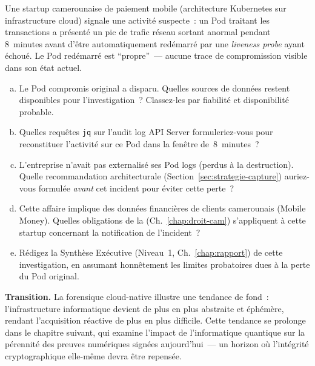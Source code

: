 \begin{boxexo}[title={\ding{45}\quad Exercice~23.3 --- Incident Kubernetes complet \niveauexpert}]
Une startup camerounaise de paiement mobile (architecture
Kubernetes sur infrastructure cloud) signale une activité suspecte~:
un Pod traitant les transactions a présenté un pic de trafic réseau
sortant anormal pendant 8~minutes avant d'être automatiquement
redémarré par une \textit{liveness probe} ayant échoué. Le Pod
redémarré est ``propre''~--- aucune trace de compromission visible
dans son état actuel.
\begin{enumerate}[(a)]
    \item Le Pod compromis original a disparu. Quelles sources
          de données restent disponibles pour l'investigation~?
          Classez-les par fiabilité et disponibilité probable.
    \item Quelles requêtes \texttt{jq} sur l'audit log API Server
          formuleriez-vous pour reconstituer l'activité sur ce
          Pod dans la fenêtre de~8~minutes~?
    \item L'entreprise n'avait pas externalisé ses Pod logs
          (perdus à la destruction). Quelle recommandation
          architecturale (Section~\ref{sec:strategie-capture})
          auriez-vous formulée \emph{avant} cet incident pour
          éviter cette perte~?
    \item Cette affaire implique des données financières de
          clients camerounais (Mobile Money). Quelles obligations
          de la  (Ch.~\ref{chap:droit-cam})
          s'appliquent à cette startup concernant la notification
          de l'incident~?
    \item Rédigez la Synthèse Exécutive (Niveau~1, Ch.~\ref{chap:rapport})
          de cette investigation, en assumant honnêtement les
          limites probatoires dues à la perte du Pod original.
\end{enumerate}
\end{boxexo}

\bigskip

\begin{boxinfo}
\textbf{Transition.} La forensique cloud-native illustre une tendance
de fond~: l'infrastructure informatique devient de plus en plus
abstraite et éphémère, rendant l'acquisition réactive de plus en
plus difficile. Cette tendance se prolonge dans le chapitre suivant,
qui examine l'impact de l'informatique quantique sur la pérennité
des preuves numériques signées aujourd'hui~--- un horizon où
l'intégrité cryptographique elle-même devra être repensée.
\end{boxinfo}